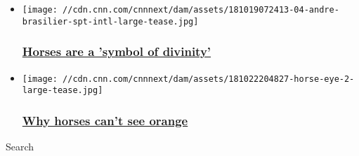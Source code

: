 \begin{itemize}
\item
  \href{/2018/10/30/sport/andre-brasilier-horses-paintings-art-spt-intl/index.html}{}

  \texttt{[image: //cdn.cnn.com/cnnnext/dam/assets/181019072413-04-andre-brasilier-spt-intl-large-tease.jpg]}

  \hypertarget{horses-are-a-symbol-of-divinity}{%
  \subsubsection{\texorpdfstring{\href{/2018/10/30/sport/andre-brasilier-horses-paintings-art-spt-intl/index.html}{Horses
  are a 'symbol of
  divinity'}}{Horses are a 'symbol of divinity'}}\label{horses-are-a-symbol-of-divinity}}
\end{itemize}

\begin{itemize}
\item
  \href{/2018/10/23/sport/racecourse-safety-horse-vision-spt-intl/index.html}{}

  \texttt{[image: //cdn.cnn.com/cnnnext/dam/assets/181022204827-horse-eye-2-large-tease.jpg]}

  \hypertarget{why-horses-cant-see-orange}{%
  \subsubsection{\texorpdfstring{\href{/2018/10/23/sport/racecourse-safety-horse-vision-spt-intl/index.html}{Why
  horses can't see
  orange}}{Why horses can't see orange}}\label{why-horses-cant-see-orange}}
\end{itemize}

Search

